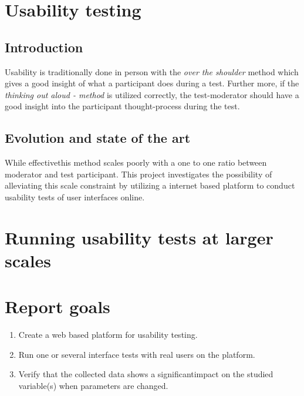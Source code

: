 \documentclass[nofilelist,dvipsnames]{cslthse-msc}
\begin{document}

  \section{Usability testing}

    \subsection{Introduction}

      Usability is traditionally done in person with the \textit{over the
        shoulder} method which gives a good insight of what a participant does
      during a test. Further more, if the \textit{thinking out aloud - method} is
      utilized correctly, the test-moderator should have a good insight into the
      participant thought-process during the test.

    \subsection{Evolution and state of the art}

      While effective\checkTruth this method scales poorly with a one to one ratio
      between moderator and test participant. This project investigates the
      possibility of alleviating this scale constraint by utilizing a internet
      based platform to conduct usability tests of user interfaces online.


  \section{Running usability tests at larger scales}


	\section{Report goals}

		\begin{enumerate}
			\item{Create a web based platform for usability testing.}
			\item{Run one or several interface tests with real users on the platform.}
			\item{
				Verify that the collected data shows a significant\checkTruth impact on the studied
				variable(s) when parameters are changed. 
			}
		\end{enumerate}
\end{document}

